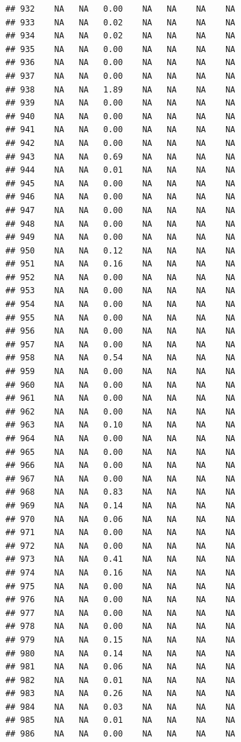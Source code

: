 \documentclass{article}\usepackage{graphicx, color}
\makeatletter
\newenvironment{kframe}{%
 \def\at@end@of@kframe{}%
 \ifinner\ifhmode%
  \def\at@end@of@kframe{\end{minipage}}%
  \begin{minipage}{\columnwidth}%
 \fi\fi%
 \def\FrameCommand##1{\hskip\@totalleftmargin \hskip-\fboxsep
 \colorbox{shadecolor}{##1}\hskip-\fboxsep
     \hskip-\linewidth \hskip-\@totalleftmargin \hskip\columnwidth}%
 \MakeFramed {\advance\hsize-\width
   \@totalleftmargin\z@ \linewidth\hsize
   \@setminipage}}%
 {\par\unskip\endMakeFramed%
 \at@end@of@kframe}
\newenvironment{knitrout}{}{} %
\makeatother
\begin{document}
\begin{knitrout}
\begin{kframe}
\begin{verbatim}
## 932    NA   NA   0.00    NA   NA    NA    NA
## 933    NA   NA   0.02    NA   NA    NA    NA
## 934    NA   NA   0.02    NA   NA    NA    NA
## 935    NA   NA   0.00    NA   NA    NA    NA
## 936    NA   NA   0.00    NA   NA    NA    NA
## 937    NA   NA   0.00    NA   NA    NA    NA
## 938    NA   NA   1.89    NA   NA    NA    NA
## 939    NA   NA   0.00    NA   NA    NA    NA
## 940    NA   NA   0.00    NA   NA    NA    NA
## 941    NA   NA   0.00    NA   NA    NA    NA
## 942    NA   NA   0.00    NA   NA    NA    NA
## 943    NA   NA   0.69    NA   NA    NA    NA
## 944    NA   NA   0.01    NA   NA    NA    NA
## 945    NA   NA   0.00    NA   NA    NA    NA
## 946    NA   NA   0.00    NA   NA    NA    NA
## 947    NA   NA   0.00    NA   NA    NA    NA
## 948    NA   NA   0.00    NA   NA    NA    NA
## 949    NA   NA   0.00    NA   NA    NA    NA
## 950    NA   NA   0.12    NA   NA    NA    NA
## 951    NA   NA   0.16    NA   NA    NA    NA
## 952    NA   NA   0.00    NA   NA    NA    NA
## 953    NA   NA   0.00    NA   NA    NA    NA
## 954    NA   NA   0.00    NA   NA    NA    NA
## 955    NA   NA   0.00    NA   NA    NA    NA
## 956    NA   NA   0.00    NA   NA    NA    NA
## 957    NA   NA   0.00    NA   NA    NA    NA
## 958    NA   NA   0.54    NA   NA    NA    NA
## 959    NA   NA   0.00    NA   NA    NA    NA
## 960    NA   NA   0.00    NA   NA    NA    NA
## 961    NA   NA   0.00    NA   NA    NA    NA
## 962    NA   NA   0.00    NA   NA    NA    NA
## 963    NA   NA   0.10    NA   NA    NA    NA
## 964    NA   NA   0.00    NA   NA    NA    NA
## 965    NA   NA   0.00    NA   NA    NA    NA
## 966    NA   NA   0.00    NA   NA    NA    NA
## 967    NA   NA   0.00    NA   NA    NA    NA
## 968    NA   NA   0.83    NA   NA    NA    NA
## 969    NA   NA   0.14    NA   NA    NA    NA
## 970    NA   NA   0.06    NA   NA    NA    NA
## 971    NA   NA   0.00    NA   NA    NA    NA
## 972    NA   NA   0.00    NA   NA    NA    NA
## 973    NA   NA   0.41    NA   NA    NA    NA
## 974    NA   NA   0.16    NA   NA    NA    NA
## 975    NA   NA   0.00    NA   NA    NA    NA
## 976    NA   NA   0.00    NA   NA    NA    NA
## 977    NA   NA   0.00    NA   NA    NA    NA
## 978    NA   NA   0.00    NA   NA    NA    NA
## 979    NA   NA   0.15    NA   NA    NA    NA
## 980    NA   NA   0.14    NA   NA    NA    NA
## 981    NA   NA   0.06    NA   NA    NA    NA
## 982    NA   NA   0.01    NA   NA    NA    NA
## 983    NA   NA   0.26    NA   NA    NA    NA
## 984    NA   NA   0.03    NA   NA    NA    NA
## 985    NA   NA   0.01    NA   NA    NA    NA
## 986    NA   NA   0.00    NA   NA    NA    NA

\end{verbatim}
\end{kframe}
\end{knitrout}
\end{document}
